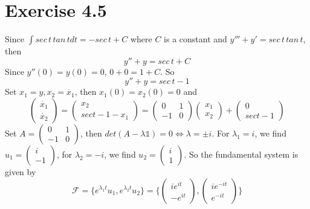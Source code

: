 \documentclass[a4paper,12pt,titlepage]{article}
\begin{document}
\section*{Exercise 4.5}
Since $\int sec\,t\,tan\,tdt=-sec\,t+C $ where $C$ is a constant and $y'''+y'=sec\,t\,tan\,t$, then 
$$y''+y=sec\,t+C$$
Since $y''(0)=y(0)=0$, $0+0=1+C$. So
$$y''+y=sec\,t-1$$
Set $x_1=y,x_2=\dot{x_1}$, then $x_1(0)=x_2(0)=0$ and
$$\begin{pmatrix}
\dot{x_1}\\
\dot{x_2}
\end{pmatrix}=\begin{pmatrix}
x_2\\
sect-1-x_1
\end{pmatrix}=\begin{pmatrix}
0&1\\
-1&0
\end{pmatrix}\begin{pmatrix}
x_1\\
x_2
\end{pmatrix}+\begin{pmatrix}
0\\
sect-1
\end{pmatrix}$$
Set $A=\begin{pmatrix}
0&1\\
-1&0
\end{pmatrix}$, then $det(A-\lambda\mathds{1})=0\Leftrightarrow \lambda=\pm i$. For $\lambda_1=i$, we find $u_1=\begin{pmatrix}
i\\
-1
\end{pmatrix}$, for $\lambda_2=-i$, we find $u_2=\begin{pmatrix}
i\\
1
\end{pmatrix}$. So the fundamental system is given by
$$\mathscr{F}=\lbrace e^{\lambda_1t}u_1,e^{\lambda_2t}u_2\rbrace=\lbrace\begin{pmatrix}
ie^{it}\\
-e^{it}
\end{pmatrix},\begin{pmatrix}
ie^{-it}\\
e^{-it}
\end{pmatrix}\rbrace$$
\end{document}

